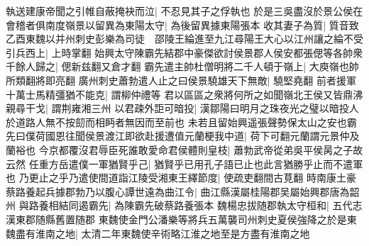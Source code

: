 執送建康帝聞之引帷自蔽掩袂而泣|{
	不忍見其子之俘執也}
於是三吳盡沒於景公侯在會稽者俱南度嶺景以留異為東陽太守|{
	為後留異據東陽張本}
收其妻子為質|{
	質音致}
乙酉東魏以并州刺史彭樂為司徒　邵陵王綸進至九江尋陽王大心以江州讓之綸不受引兵西上|{
	上時掌翻}
始興太守陳霸先結郡中豪傑欲討侯景郡人侯安都張偲等各帥衆千餘人歸之|{
	偲新兹翻又倉才翻}
霸先遣主帥杜僧明將二千人頓于嶺上|{
	大庾嶺也帥所類翻將即亮翻}
廣州刺史蕭勃遣人止之曰侯景驍雄天下無敵|{
	驍堅堯翻}
前者援軍十萬士馬精彊猶不能克|{
	謂柳仲禮等}
君以區區之衆將何所之如聞嶺北王侯又皆鼎沸親尋干戈|{
	謂荆雍湘三州}
以君疎外詎可暗投|{
	漢鄒陽曰明月之珠夜光之璧以暗投人於道路人無不按劎而相眄者無因而至前也}
未若且留始興遥張聲勢保太山之安也霸先曰僕荷國恩往聞侯景渡江即欲赴援遭值元蘭梗我中道|{
	荷下可翻元蘭謂元景仲及蘭裕也}
今京都覆沒君辱臣死誰敢愛命君侯體則皇枝|{
	蕭勃武帝從弟吳平侯昺之子故云然}
任重方岳遣僕一軍猶賢乎己|{
	猶賢乎已用孔子語已止也此言猶勝乎止而不遣軍也}
乃更止之乎乃遣使間道詣江陵受湘東王繹節度|{
	使疏吏翻間古莧翻}
時南康土豪蔡路養起兵據郡勃乃以腹心譚世遠為曲江令|{
	曲江縣漢屬桂陽郡吴屬始興郡唐為韶州}
與路養相結同遏霸先|{
	為陳霸先破蔡路養張本}
魏楊忠拔随郡執太守桓和|{
	五代志漢東郡随縣舊置随郡}
東魏使金門公潘樂等將兵五萬襲司州刺史夏侯強降之於是東魏盡有淮南之地|{
	太清二年東魏使辛術略江淮之地至是方盡有淮南之地}


